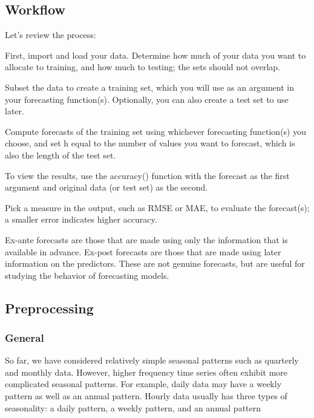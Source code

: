 \documentclass[]{book}
\begin{document}
\hypertarget{workflow-1}{%
\subsection{Workflow}\label{workflow-1}}

Let's review the process:

First, import and load your data. Determine how much of your data you want to allocate to training, and how much to testing; the sets should not overlap.

Subset the data to create a training set, which you will use as an argument in your forecasting function(s). Optionally, you can also create a test set to use later.

Compute forecasts of the training set using whichever forecasting function(s) you choose, and set h equal to the number of values you want to forecast, which is also the length of the test set.

To view the results, use the accuracy() function with the forecast as the first argument and original data (or test set) as the second.

Pick a measure in the output, such as RMSE or MAE, to evaluate the forecast(s); a smaller error indicates higher accuracy.

Ex-ante forecasts are those that are made using only the information that is available in advance. Ex-post forecasts are those that are made using later information on the predictors. These are not genuine forecasts, but are useful for studying the behavior of forecasting models.

\hypertarget{preprocessing}{%
\subsection{Preprocessing}\label{preprocessing}}

\hypertarget{general-4}{%
\subsubsection{General}\label{general-4}}

So far, we have considered relatively simple seasonal patterns such as quarterly and monthly data. However, higher frequency time series often exhibit more complicated seasonal patterns. For example, daily data may have a weekly pattern as well as an annual pattern. Hourly data usually has three types of seasonality: a daily pattern, a weekly pattern, and an annual pattern
\end{document}
